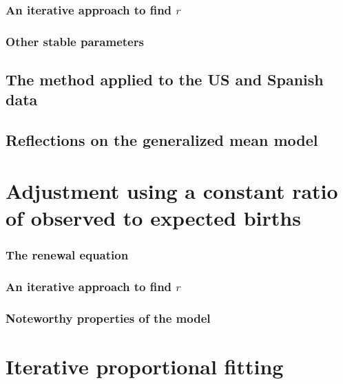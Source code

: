       \subsection{An iterative approach to find $r$}
         
      \subsection{Other stable parameters}
         
      \section{The method applied to the US and Spanish data}
        
      \section{Reflections on the generalized mean model}
        
        
  \chapter{Adjustment using a constant ratio of observed to expected births}
      
    \subsection{The renewal equation}
      
 
    \subsection{An iterative approach to find $r$}
      
      
    \subsection{Noteworthy properties of the model}
      
  
  \chapter{Iterative proportional fitting}
      
